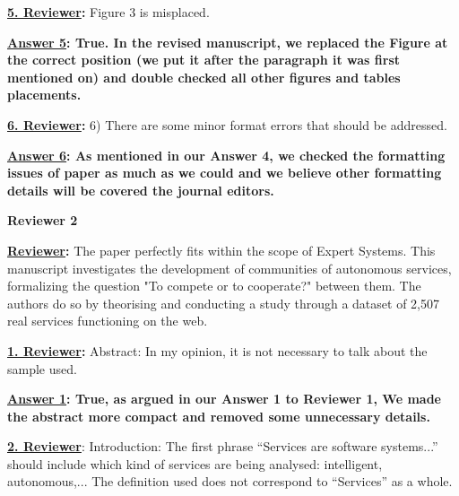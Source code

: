\documentclass[times, 12pt,a4paper]{article}
\begin{document}
\vspace{0.5cm}\textbf{\underline{5. Reviewer}:} Figure 3 is misplaced.

\vspace{0.2cm}\textbf{\underline{Answer 5}: True. In the revised manuscript, we replaced the Figure at the correct position (we put it after the paragraph it was first mentioned on) and double checked all other figures and tables placements.}


\vspace{0.5cm}\textbf{\underline{6. Reviewer}:} 6) There are some minor format errors that should be addressed.

\vspace{0.2cm}\textbf{\underline{Answer 6}: As mentioned in our Answer 4, we checked the formatting issues of paper as much as we could and we believe other formatting details will be covered the journal editors.
}



\vspace{2cm}

\newpage

\begin{center}
  \textbf{Reviewer 2}
\end{center}


\textbf{\underline{Reviewer}:} The paper perfectly fits within the scope of Expert Systems. This manuscript investigates the development of communities of autonomous services, formalizing the question "To compete or to cooperate?" between them. The authors do so by theorising and conducting a study through a dataset of 2,507 real services functioning on the web.


\vspace{0.5cm}\textbf{\underline{1. Reviewer}:}  Abstract: In my opinion, it is not necessary to talk about the sample used.

\vspace{0.2cm}\textbf{\underline{Answer 1}: True, as argued in our Answer 1 to Reviewer 1, We made the abstract more compact and removed some unnecessary details. }

\vspace{0.5cm} \textbf{\underline{2. Reviewer}}:  Introduction: The first phrase ``Services are software systems...'' should include which kind of services are being analysed: intelligent, autonomous,... The definition used does not correspond to ``Services'' as a whole.
\end{document}
